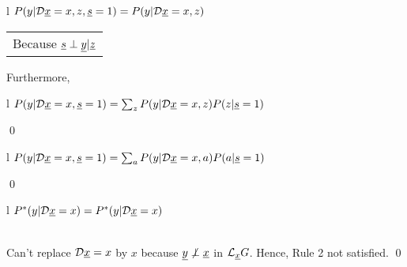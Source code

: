\begin{claim}
\label{cl-decTransportDirect}
\decTransportDirect
\end{claim}
\proof
\begin{longtable}{l}
\color{red}
$P(y|\cald\rvx=x, z, \rvs=1)=
P(y|\cald\rvx=x, z)$
\\
\xymatrix{\\=}
\begin{tabular}{l}
Because $\rvs\perp\rvy|\rvz$
\end{tabular}
\end{longtable}
Furthermore,
\begin{longtable}{l}
\color{red}
$P(y|\cald \rvx=x, \rvs=1)
=\sum_z P(y|\cald\rvx=x,z)P(z|\rvs=1)$
\\
\end{longtable}
\qed

\begin{claim}
\label{cl-decTransportBox}
\decTransportBox
\end{claim}
\proof
\begin{longtable}{l}
\color{red}$
P(y|\cald\rvx=x, \rvs=1)
=\sum_{a}
P(y|\cald\rvx=x,a)P(a|\rvs=1)$
\\
\xymatrix{\\=}
\end{longtable}
\qed


\begin{claim}
\label{cl-decTransportNon}
\decTransportNon
\end{claim}
\proof
\begin{longtable}{l}
\color{red}
$P^*(y|\cald\rvx=x)=P^*(y|\cald\rvx=x)$
\\
\\
\xymatrix{\\=}
\end{longtable}
Can't replace $\cald\rvx=x$
by $x$ because
$\rvy\not\perp \rvx$ in
$\call_\rvx G$.
Hence, Rule 2 not satisfied.
\qed



